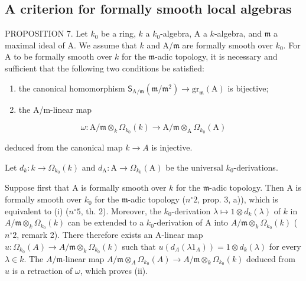 \subsection{A criterion for formally smooth local algebras}

PROPOSITION 7. Let \(k_{0}\) be a ring, \(k\) a \(k_{0}\)-algebra, A a \(k\)-algebra, and \(\mathfrak{m}\) a maximal ideal of A. We assume that \(k\) and A/\(\mathfrak{m}\) are formally smooth over \(k_{0}\). For A to be formally smooth over \(k\) for the \(\mathfrak{m}\)-adic topology, it is necessary and sufficient that the following two conditions be satisfied:

\begin{enumerate}
\def\labelenumi{(\roman{enumi})}
\item
  the canonical homomorphism \(\mathsf{S}_{\mathrm{A} / \mathfrak{m}}(\mathfrak{m} / \mathfrak{m}^{2})\to \mathrm{gr}_{\mathfrak{m}}(\mathrm{A})\) is bijective;
\item
  the A/m-linear map
\end{enumerate}

\[
\omega : \mathrm{A} / \mathfrak {m} \otimes_ {k} \Omega_ {k _ {0}} (k) \longrightarrow \mathrm{A} / \mathfrak {m} \otimes_ {\mathrm{A}} \Omega_ {k _ {0}} (\mathrm{A})
\]

deduced from the canonical map \(k \to A\) is injective.

Let \(d_{k}:k\to \Omega_{k_{0}}(k)\) and \(d_{\mathrm{A}}:\mathrm{A}\to \Omega_{k_0}(\mathrm{A})\) be the universal \(k_{0}\)-derivations.

Suppose first that A is formally smooth over \(k\) for the \(\mathfrak{m}\)-adic topology. Then A is formally smooth over \(k_{0}\) for the \(\mathfrak{m}\)-adic topology (\(n^{\circ} 2\), prop. 3, a)), which is equivalent to (i) (\(n^{\circ} 5\), th. 2). Moreover, the \(k_{0}\)-derivation \(\lambda \mapsto 1 \otimes d_{k}(\lambda)\) of \(k\) in \(A/\mathfrak{m} \otimes_{k} \Omega_{k_{0}}(k)\) can be extended to a \(k_{0}\)-derivation of A into \(A/\mathfrak{m} \otimes_{k} \Omega_{k_{0}}(k)\) (\(n^{\circ} 2\), remark 2). There therefore exists an A-linear map \(u: \Omega_{k_{0}}(A) \to A/\mathfrak{m} \otimes_{k} \Omega_{k_{0}}(k)\) such that \(u(d_{A}(\lambda 1_{A})) = 1 \otimes d_{k}(\lambda)\) for every \(\lambda \in k\). The \(A/\mathfrak{m}\)-linear map \(A/\mathfrak{m} \otimes_{A} \Omega_{k_{0}}(A) \longrightarrow A/\mathfrak{m} \otimes_{k} \Omega_{k_{0}}(k)\) deduced from \(u\) is a retraction of \(\omega\), which proves (ii).

